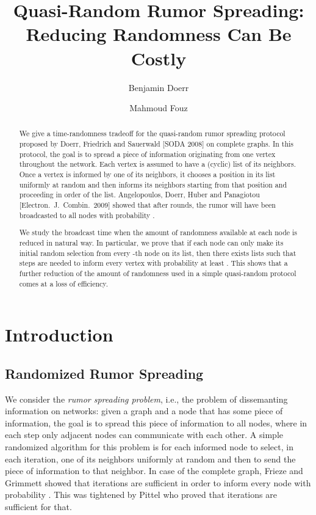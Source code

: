 \documentclass{article}
\title{Quasi-Random Rumor Spreading: Reducing Randomness Can Be Costly}
\author{Benjamin Doerr \and  Mahmoud Fouz}
\begin{document}
\maketitle











\begin{abstract}
We give a time-randomness tradeoff for the quasi-random rumor spreading protocol proposed by Doerr, Friedrich and Sauerwald [SODA 2008] on complete graphs. In this protocol, the goal is to spread a piece of information originating from one vertex throughout the network. Each vertex is assumed to have a (cyclic) list of its neighbors. Once a vertex is informed by one of its neighbors, it chooses a position in its list uniformly at random and then informs its neighbors starting from that position and proceeding in order of the list. Angelopoulos, Doerr, Huber and Panagiotou [Electron.~J.~Combin.~2009] showed that after  rounds, the rumor will have been broadcasted to all nodes with probability . 

We study the broadcast time when the amount of randomness available at each node is reduced in natural way. In particular, we prove that if each node can only make its initial random selection from every -th node on its list, then there exists lists such that  steps are needed to inform every vertex with probability at least . This shows that a further reduction of the amount of randomness used in a simple quasi-random protocol comes at a loss of efficiency.
\end{abstract}




\section{Introduction}

\subsection{Randomized Rumor Spreading}

We consider the \textit{rumor spreading problem}, i.e., the problem of dissemanting information on networks: given a graph  and a node  that has some piece of information, the goal is to spread this piece of information to all nodes, where in each step only adjacent nodes can communicate with each other. A simple randomized algorithm for this problem is for each informed node to select, in each iteration, one of its neighbors uniformly at random and then to send the piece of information to that neighbor. In case of the complete graph, Frieze and Grimmett \cite{FG85} showed that  iterations are sufficient in order to inform every node with probability . This was tightened by Pittel \cite{Pi87} who proved that  iterations are sufficient for that. 
\end{document}
